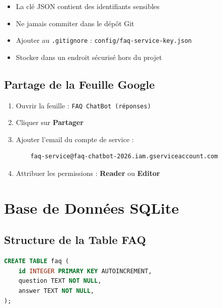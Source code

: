 \documentclass[11pt,a4paper]{article}
\begin{document}
\begin{important}
\begin{itemize}
    \item La clé JSON contient des identifiants sensibles
    \item Ne jamais commiter dans le dépôt Git
    \item Ajouter au \texttt{.gitignore} : \texttt{config/faq-service-key.json}
    \item Stocker dans un endroit sécurisé hors du projet
\end{itemize}
\end{important}

\subsection{Partage de la Feuille Google}
\begin{enumerate}
    \item Ouvrir la feuille : \texttt{FAQ ChatBot (réponses)}
    \item Cliquer sur \textbf{Partager}
    \item Ajouter l'email du compte de service :
    \begin{verbatim}
    faq-service@faq-chatbot-2026.iam.gserviceaccount.com
    \end{verbatim}
    \item Attribuer les permissions : \textbf{Reader} ou \textbf{Editor}
\end{enumerate}

\section{Base de Données SQLite}
\label{sec:database}

\subsection{Structure de la Table FAQ}
\begin{lstlisting}[language=SQL]
CREATE TABLE faq (
    id INTEGER PRIMARY KEY AUTOINCREMENT,
    question TEXT NOT NULL,
    answer TEXT NOT NULL,
);
\end{lstlisting}
\end{document}
